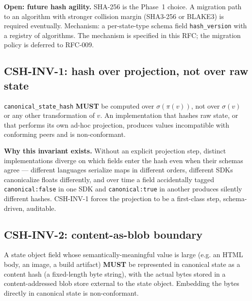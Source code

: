 \documentclass[11pt,a4paper]{article}
\theoremstyle{definition}
\begin{document}
\begin{decisionbox}
\textbf{Open: future hash agility.} SHA-256 is the Phase~1 choice.
A migration path to an algorithm with stronger collision margin
(SHA3-256 or BLAKE3) is required eventually. Mechanism: a per-state-type
schema field \texttt{hash\_version} with a registry of algorithms.
The mechanism is specified in this RFC; the migration policy is
deferred to RFC-009.
\end{decisionbox}

\subsection{CSH-INV-1: hash over projection, not over raw state}

\begin{invariant}
\texttt{canonical\_state\_hash} \textbf{MUST} be computed over
$\sigma(\pi(v))$, not over $\sigma(v)$ or any other transformation
of $v$. An implementation that hashes raw state, or that performs
its own ad-hoc projection, produces values incompatible with
conforming peers and is non-conformant.
\end{invariant}

\textbf{Why this invariant exists.} Without an explicit projection
step, distinct implementations diverge on which fields enter the
hash even when their schemas agree --- different languages serialize
maps in different orders, different SDKs canonicalize floats
differently, and over time a field accidentally tagged
\texttt{canonical:false} in one SDK and \texttt{canonical:true} in
another produces silently different hashes. CSH-INV-1 forces the
projection to be a first-class step, schema-driven, auditable.

\subsection{CSH-INV-2: content-as-blob boundary}
\label{sec:content-as-blob}

\begin{invariant}
A state object field whose semantically-meaningful value is large
(e.g. an HTML body, an image, a build artifact) \textbf{MUST} be
represented in canonical state as a content hash (a fixed-length
byte string), with the actual bytes stored in a content-addressed
blob store external to the state object. Embedding the bytes
directly in canonical state is non-conformant.
\end{invariant}
\end{document}
